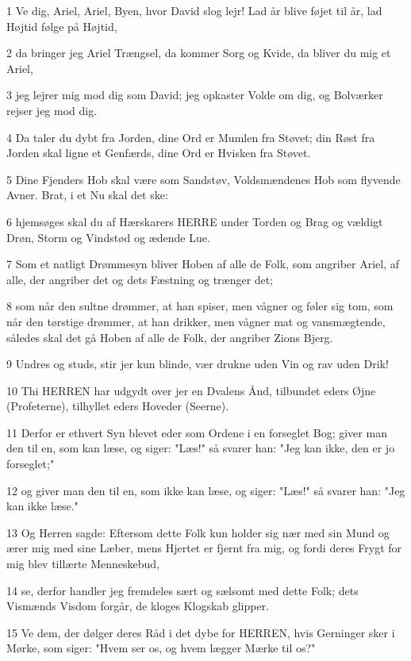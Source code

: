 \par 1 Ve dig, Ariel, Ariel, Byen, hvor David slog lejr! Lad år blive føjet til år, lad Højtid følge på Højtid,
\par 2 da bringer jeg Ariel Trængsel, da kommer Sorg og Kvide, da bliver du mig et Ariel,
\par 3 jeg lejrer mig mod dig som David; jeg opkaster Volde om dig, og Bolværker rejser jeg mod dig.
\par 4 Da taler du dybt fra Jorden, dine Ord er Mumlen fra Støvet; din Røst fra Jorden skal ligne et Genfærds, dine Ord er Hvisken fra Støvet.
\par 5 Dine Fjenders Hob skal være som Sandstøv, Voldsmændenes Hob som flyvende Avner. Brat, i et Nu skal det ske:
\par 6 hjemsøges skal du af Hærskarers HERRE under Torden og Brag og vældigt Drøn, Storm og Vindstød og ædende Lue.
\par 7 Som et natligt Drømmesyn bliver Hoben af alle de Folk, som angriber Ariel, af alle, der angriber det og dets Fæstning og trænger det;
\par 8 som når den sultne drømmer, at han spiser, men vågner og føler sig tom, som når den tørstige drømmer, at han drikker, men vågner mat og vansmægtende, således skal det gå Hoben af alle de Folk, der angriber Zions Bjerg.
\par 9 Undres og studs, stir jer kun blinde, vær drukne uden Vin og rav uden Drik!
\par 10 Thi HERREN har udgydt over jer en Dvalens Ånd, tilbundet eders Øjne (Profeterne), tilhyllet eders Hoveder (Seerne).
\par 11 Derfor er ethvert Syn blevet eder som Ordene i en forseglet Bog; giver man den til en, som kan læse, og siger: "Læs!" så svarer han: "Jeg kan ikke, den er jo forseglet;"
\par 12 og giver man den til en, som ikke kan læse, og siger: "Læs!" så svarer han: "Jeg kan ikke læse."
\par 13 Og Herren sagde: Eftersom dette Folk kun holder sig nær med sin Mund og ærer mig med sine Læber, mens Hjertet er fjernt fra mig, og fordi deres Frygt for mig blev tillærte Menneskebud,
\par 14 se, derfor handler jeg fremdeles sært og sælsomt med dette Folk; dets Vismænds Visdom forgår, de kloges Klogskab glipper.
\par 15 Ve dem, der dølger deres Råd i det dybe for HERREN, hvis Gerninger sker i Mørke, som siger: "Hvem ser os, og hvem lægger Mærke til os?"
